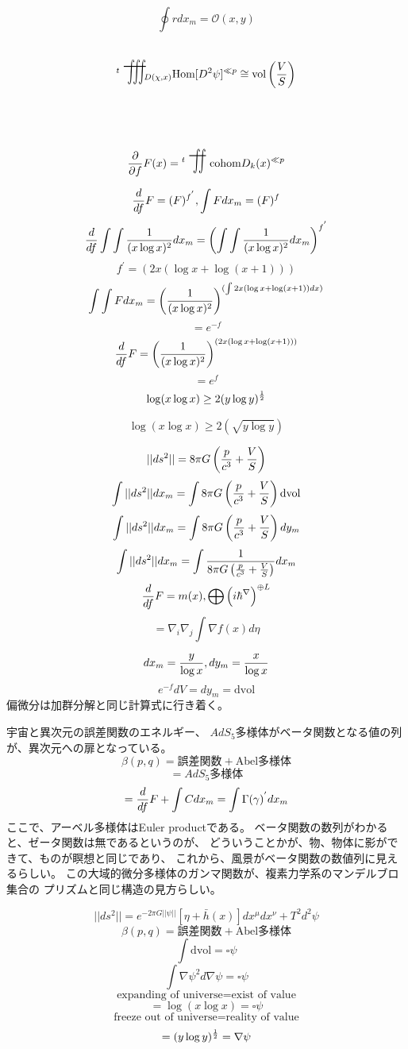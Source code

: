 \documentclass{jsarticle}
\begin{document}
 $$ \oint r dx_m = \mathcal{O}(x,y) $$

 $$ {{}^t \scalebox{1}[2]{\variiint}}_{{D(\chi,x)}} 
 \text{Hom}[D^2 \psi]^{\ll p} \cong 
 \text{vol}\left({V \over S}\right) $$

 $$ {\partial \over \partial f}F(x) = {{}^t \scalebox{1}[2]{\variint}} 
 \text{cohom}D_k(x)^{\ll p} $$

 $$ {d \over df}F = (F)^{f^{'}}, \int F dx_m = (F)^{f}  $$
 $$ {d \over df}\int \int{1 \over (x \log x)^2}dx_m =
 \left(\int \int{1 \over (x \log x)^2}dx_m \right)^{f^{'}}  $$
 $$ f^{'} = (2x (\log x + \log (x + 1))) $$
  $$  \int \int F dx_m = \left({1 \over (x \log x)^2}\right)^{
	  (\int 2x (\log x + \log (x + 1))dx)} $$ 
   $$= e^{-f} $$
  $$ {d \over df}F = \left({1 \over (x \log x)^2}\right)^{
	  (2x (\log x + \log (x + 1))) } $$  
  $$= e^{f} $$
  $$ \log (x \log x) \ge 2(y \log y)^{1 \over 2} $$

  $$ \log (x \log x) \ge 2(\sqrt{y \log y}) $$

 
    $$ ||ds^2|| = 8 \pi G \left({p \over c^3} + {V \over S}\right) $$
    $$ \int ||ds^2||dx_m  = \int 8 \pi G \left({p \over c^3} 
    + {V \over S}\right)\mathrm{dvol}  $$
    $$ \int ||ds^2||dx_m  = \int 8 \pi G \left({p \over c^3} 
    + {V \over S}\right)dy_m $$
     $$ \int ||ds^2||dx_m  = \int {1 \over {8 \pi G \left({p \over c^3} 
    + {V \over S}\right)}}dx_m $$
    $$ {d \over df}F = m(x), \bigoplus \left({i \hbar}^{\nabla}\right)^{
	    \oplus L} $$
    $$ = \nabla_{i} \nabla_{j} \int \nabla f(x)d \eta $$

    $$ dx_m = {y \over {\log x}}, dy_m = {x \over \log x} $$
    $$ e^{-f}dV = dy_m = \mathrm{dvol} $$
    偏微分は加群分解と同じ計算式に行き着く。

   宇宙と異次元の誤差関数のエネルギー、
    $AdS_5$多様体がベータ関数となる値の列が、異次元への扉となっている。
    $$ \beta(p,q) = \text{誤差関数} + \text{Abel多様体} $$
    $$ = \text{$AdS_5$多様体} $$
    $$ = {d \over df}F + \int C dx_m = \int \Gamma(\gamma)^{'}dx_m $$
    ここで、アーベル多様体はEuler productである。
    ベータ関数の数列がわかると、ゼータ関数は無であるというのが、
    どういうことかが、物、物体に影ができて、ものが瞑想と同じであり、
    これから、風景がベータ関数の数値列に見えるらしい。
     この大域的微分多様体のガンマ関数が、複素力学系のマンデルブロ集合の
    プリズムと同じ構造の見方らしい。

    $$ ||ds^2|| = e^{-2\pi G ||\psi||}[\eta + \bar{h}(x)]dx^{\mu}dx^{\nu}
    + T^2 d^2 \psi $$
    $$ \beta(p,q) = \text{誤差関数} + \text{Abel多様体} $$
    $$ \int \mathrm{dvol} = \square \psi $$
    $$ \int \nabla \psi^2 d \nabla \psi = \square \psi $$
    $$ \text{expanding of universe} = \text{exist of value} $$
    $$ = \log (x \log x) = \square \psi $$
    $$ \text{freeze out of universe} = \text{reality of value} $$
    $$ = (y \log y)^{1 \over 2} = \nabla \psi $$
\end{document}
